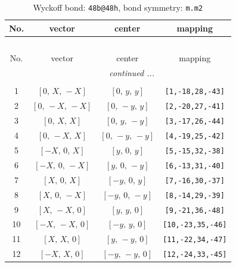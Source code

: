 \documentclass[fleqn,8pt]{jsarticle}
\begin{document}
\renewcommand{\arraystretch}{1.2}
\begin{longtable}{cccc}
\caption{Wyckoff bond: {\tt 48b@48h}, bond symmetry: {\tt m.m2}}
 \\
 \hline \hline
No. & vector & center & mapping \\ \hline \endfirsthead

\multicolumn{3}{l}{\tablename\ \thetable{}} \\
 \hline \hline
No. & vector & center & mapping \\ \hline \endhead

 \hline \hline
\multicolumn{3}{r}{\footnotesize\it continued ...} \\ \endfoot

 \hline \hline
\multicolumn{3}{r}{} \\ \endlastfoot

1 & $\left[ 0,\, X,\, - X \right]$ & $\left[ 0,\, y,\, y \right]$ & {\tt [1,-18,28,-43]} \\ \hline
2 & $\left[ 0,\, - X,\, - X \right]$ & $\left[ 0,\, - y,\, y \right]$ & {\tt [2,-20,27,-41]} \\ \hline
3 & $\left[ 0,\, X,\, X \right]$ & $\left[ 0,\, y,\, - y \right]$ & {\tt [3,-17,26,-44]} \\ \hline
4 & $\left[ 0,\, - X,\, X \right]$ & $\left[ 0,\, - y,\, - y \right]$ & {\tt [4,-19,25,-42]} \\ \hline
5 & $\left[ - X,\, 0,\, X \right]$ & $\left[ y,\, 0,\, y \right]$ & {\tt [5,-15,32,-38]} \\ \hline
6 & $\left[ - X,\, 0,\, - X \right]$ & $\left[ y,\, 0,\, - y \right]$ & {\tt [6,-13,31,-40]} \\ \hline
7 & $\left[ X,\, 0,\, X \right]$ & $\left[ - y,\, 0,\, y \right]$ & {\tt [7,-16,30,-37]} \\ \hline
8 & $\left[ X,\, 0,\, - X \right]$ & $\left[ - y,\, 0,\, - y \right]$ & {\tt [8,-14,29,-39]} \\ \hline
9 & $\left[ X,\, - X,\, 0 \right]$ & $\left[ y,\, y,\, 0 \right]$ & {\tt [9,-21,36,-48]} \\ \hline
10 & $\left[ - X,\, - X,\, 0 \right]$ & $\left[ - y,\, y,\, 0 \right]$ & {\tt [10,-23,35,-46]} \\ \hline
11 & $\left[ X,\, X,\, 0 \right]$ & $\left[ y,\, - y,\, 0 \right]$ & {\tt [11,-22,34,-47]} \\ \hline
12 & $\left[ - X,\, X,\, 0 \right]$ & $\left[ - y,\, - y,\, 0 \right]$ & {\tt [12,-24,33,-45]} \\
\end{longtable}
\end{document}
